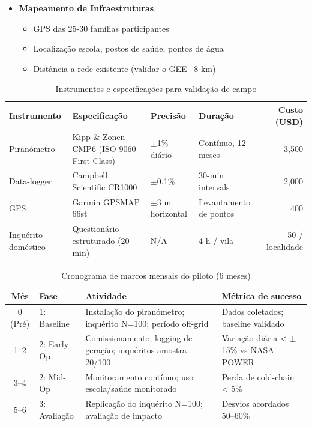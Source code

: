 \documentclass[12pt, a4paper]{article}
\begin{document}
\begin{itemize}
\begin{itemize}
\item \textbf{Mapeamento de Infraestruturas}:
  \begin{itemize}
  \item GPS das 25-30 famílias participantes
  \item Localização escola, postos de saúde, pontos de água
  \item Distância a rede existente (validar o GEE ~8 km)
  \end{itemize}
\end{itemize}
\begin{table}[H]
\centering
\caption{Instrumentos e especificações para validação de campo}
\label{tab:validation_instruments}
\footnotesize
\begin{tabular}{@{}p{3.5cm}p{5cm}p{2.5cm}p{2.5cm}r@{}}
\toprule
\textbf{Instrumento} & \textbf{Especificação} & \textbf{Precisão} & \textbf{Duração} & \textbf{Custo (USD)} \\
\midrule
Piranómetro & Kipp \& Zonen CMP6 (ISO 9060 First Class) & $\pm$1\% diário & Contínuo, 12 meses & 3,500 \\
Data-logger & Campbell Scientific CR1000 & $\pm$0.1\% & 30-min intervals & 2,000 \\
GPS & Garmin GPSMAP 66st & $\pm$3 m horizontal & Levantamento de pontos & 400 \\
Inquérito doméstico & Questionário estruturado (20 min) & N/A & 4 h / vila & 50 / localidade \\
\bottomrule
\end{tabular}
\end{table}

\begin{table}[H]
\centering
\caption{Cronograma de marcos mensais do piloto (6 meses)}
\label{tab:validation_timeline}
\begin{tabular}{|c|l|p{7cm}|p{3.5cm}|}
\hline
\textbf{Mês} & \textbf{Fase} & \textbf{Atividade} & \textbf{Métrica de sucesso} \\
\hline
0 (Pré) & 1: Baseline & Instalação do piranómetro; inquérito N=100; período off-grid & Dados coletados; baseline validado \\
\hline
1--2 & 2: Early Op & Comissionamento; logging de geração; inquéritos amostra 20/100 & Variação diária < $\pm$15\% vs NASA POWER \\
\hline
3--4 & 2: Mid-Op & Monitoramento contínuo; uso escola/saúde monitorado & Perda de cold-chain < 5\% \\
\hline
5--6 & 3: Avaliação & Replicação do inquérito N=100; avaliação de impacto & Desvios acordados 50--60\% \\
\hline
\end{tabular}
\end{table}


\end{itemize}
\end{document}
